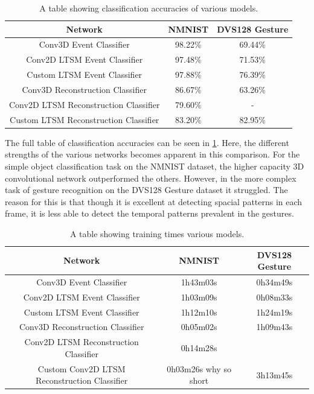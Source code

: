 \begin{table}[htb]
    \centering
    \begin{tabular}{|| c | c | c ||}
        \hline
        Network     & NMNIST & DVS128 Gesture \\
        \hline \hline
        Conv3D Event Classifier          & 98.22\%   &   69.44\%    \\
        \hline
        Conv2D LTSM Event Classifier         & 97.48\%   &    71.53\%    \\
        \hline
        Custom LTSM Event Classifier         & 97.88\%  &   76.39\%     \\
        \hline
        Conv3D Reconstruction Classifier           & 86.67\%    &   63.26\%    \\
        \hline
        Conv2D LTSM Reconstruction Classifier          & 79.60\%   &  -    \\
        \hline
        Custom LTSM Reconstruction Classifier         & 83.20\%  &   82.95\%   \\
        \hline
    \end{tabular}
    \caption{A table showing classification accuracies of various models.}
    \label{tab:network_performances}
\end{table}

The full table of classification accuracies can be seen in \cref{tab:network_performances}. Here, the different strengths of the various networks becomes apparent in this comparison. For the simple object classification task on the NMNIST dataset, the higher capacity 3D convolutional network outperformed the others. However, in the more complex task of gesture recognition on the DVS128 Gesture dataset it struggled. The reason for this is that though it is excellent at detecting spacial patterns in each frame, it is less able to detect the temporal patterns prevalent in the gestures.

\begin{table}[htb]
    \centering
    \begin{tabular}{|| c | c | c ||}
        \hline
        Network     & NMNIST & DVS128 Gesture \\
        \hline \hline
        Conv3D Event Classifier          & 1h43m03s   &   0h34m49s    \\
        \hline
        Conv2D LTSM Event Classifier         & 1h03m09s   &    0h08m33s    \\
        \hline
        Custom LTSM Event Classifier         &  1h12m10s  &    \color{red} 1h24m19s \color{black}    \\
        \hline
        Conv3D Reconstruction Classifier        &  0h05m02s    &    1h09m43s  \\
        \hline
        Conv2D LTSM Reconstruction Classifier        &  0h14m28s    &      \\
        \hline
        Custom Conv2D LTSM Reconstruction Classifier         &  0h03m26s \color{red} why so short \color{black}  &    3h13m45s   \\
        \hline
    \end{tabular}
    \caption{A table showing training times various models.}
    \label{tab:network_training_times}
\end{table}


